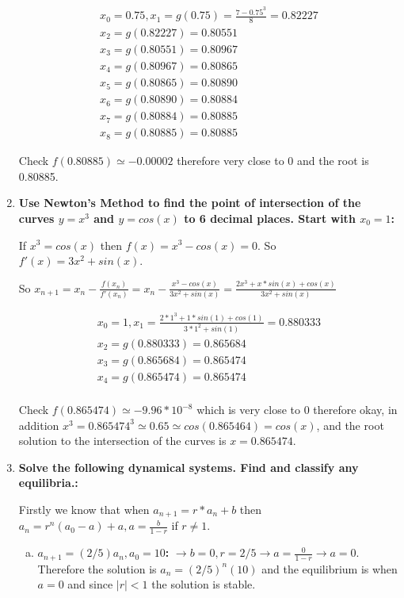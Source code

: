 \documentclass{article}
\begin{document}
\begin{enumerate}[1.]
\begin{gather*}
x_0 = 0.75, x_1 = g(0.75) = \frac{7 - 0.75^3}{8} = 0.82227 \\
x_2 = g(0.82227) = 0.80551 \\
x_3 = g(0.80551) = 0.80967 \\
x_4 = g(0.80967) = 0.80865 \\ 
x_5 = g(0.80865) = 0.80890 \\
x_6 = g(0.80890) = 0.80884 \\
x_7 = g(0.80884) = 0.80885 \\
x_8 = g(0.80885) = 0.80885
\end{gather*}

Check $f(0.80885) \simeq -0.00002$ therefore very close to 0 and the root is 0.80885.

\item
\textbf{Use Newton’s Method to find the point of intersection of the curves $y = x^3$ and $y = cos(x)$ to 6 decimal places. Start with $x_0 = 1$:}

If $x^3 = cos(x)$ then $f(x) = x^3 - cos(x) = 0$. So $f\prime(x) = 3x^2 + sin(x)$.

So $x_{n+1} = x_n - \frac{f(x_n)}{f\prime(x_n)} = x_n - \frac{x^3 - cos(x)}{3x^2 + sin(x)} = \frac{2x^3 + x * sin(x) + cos(x)}{3x^2 + sin(x)}$

\begin{gather*}
x_0 = 1, x_1 = \frac{2* 1^3 + 1 * sin(1) + cos(1)}{3 * 1^2 + sin(1)} = 0.880333 \\
x_2 = g(0.880333) = 0.865684 \\
x_3 = g(0.865684) = 0.865474 \\
x_4 = g(0.865474) = 0.865474 \\
\end{gather*}

Check $f(0.865474) \simeq -9.96 * 10^{-8}$ which is very close to 0 therefore okay, in addition $x^3 = 0.865474^3 \simeq 0.65 \simeq cos(0.865464) = cos(x)$, and the root solution to the intersection of the curves is $x = 0.865474$.

\item
\textbf{Solve the following dynamical systems. Find and classify any equilibria.:}

Firstly we know that when $a_{n+1} = r*a_n + b$ then $a_n = r^n(a_0 - a) + a, a = \frac{b}{1-r}$ if $r \neq 1$.

\begin{enumerate}[(a)]
  \item \textbf{$a_{n+1} = (2/5)a_n, a_0 = 10$:} 
$\to b = 0, r=2/5 \to a = \frac{0}{1 - r} \to a = 0$. Therefore the solution is $a_n = (2/5)^n(10)$ and the equilibrium is when $a = 0$ and since $|r| < 1$ the solution is stable.


\end{enumerate}
\end{enumerate}
\end{document}
